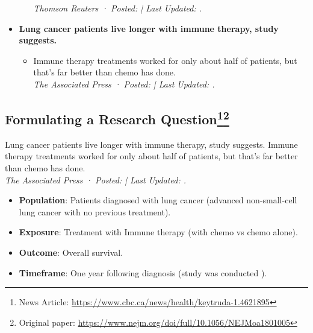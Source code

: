 \begin{itemize}
\begin{itemize}
                    \emph{Thomson Reuters · Posted:  | Last Updated: .}%
          \end{itemize}
    \item \textbf{Lung cancer patients live longer with immune therapy, study suggests.}
          \begin{itemize}
              \item Immune therapy treatments worked for only about half of patients, but that's far better than chemo has done.\\
                    \emph{The Associated Press · Posted:  | Last Updated: .}%
          \end{itemize}
\end{itemize}
\subsection*{Formulating a Research Question\footnote{News Article: \href{https://www.cbc.ca/news/health/keytruda-1.4621895}{https://www.cbc.ca/news/health/keytruda-1.4621895}}\footnote{Original paper: \href{https://www.nejm.org/doi/full/10.1056/NEJMoa1801005}{https://www.nejm.org/doi/full/10.1056/NEJMoa1801005}}}
\begin{paragraph}{Lung cancer patients live longer with immune therapy, study suggests.}
    Immune therapy treatments worked for only about half of patients, but that's far better than chemo has done.\\
    \emph{The Associated Press · Posted:  | Last Updated: .}%
\end{paragraph}
\begin{itemize}
    \item \textbf{Population}: Patients diagnosed with lung cancer (advanced non-small-cell lung cancer with no previous treatment).
    \item \textbf{Exposure}: Treatment with Immune therapy (with chemo vs chemo alone).
    \item \textbf{Outcome}: Overall survival.
    \item \textbf{Timeframe}: One year following diagnosis (study was conducted \printdayoff{}).%
\end{itemize}
